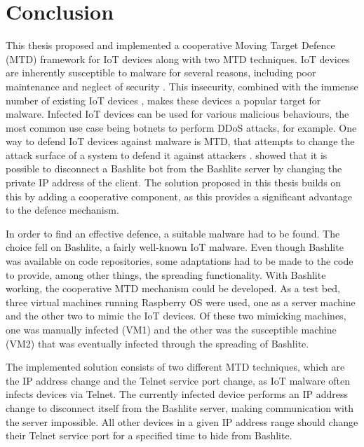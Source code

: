 \chapter{Conclusion}
This thesis proposed and implemented a cooperative Moving Target Defence (MTD) framework for IoT devices along with two MTD techniques. IoT devices are inherently susceptible to malware for several reasons, including poor maintenance and neglect of security \cite{article:DDoSinIoT}. This insecurity, combined with the immense number of existing IoT devices \cite{website:statistaIoT}, makes these devices a popular target for malware. Infected IoT devices can be used for various malicious behaviours, the most common use case being botnets to perform DDoS attacks, for example. One way to defend IoT devices against malware is MTD, that attempts to change the attack surface of a system to defend it against attackers \cite{navas:2021MTDWhere}. \cite{article:vonderAssen} showed that it is possible to disconnect a Bashlite bot from the Bashlite server by changing the private IP address of the client. The solution proposed in this thesis builds on this by adding a cooperative component, as this provides a significant advantage to the defence mechanism.

In order to find an effective defence, a suitable malware had to be found. The choice fell on Bashlite, a fairly well-known IoT malware. Even though Bashlite was available on code repositories, some adaptations had to be made to the code to provide, among other things, the spreading functionality. With Bashlite working, the cooperative MTD mechanism could be developed. As a test bed, three virtual machines running Raspberry OS were used, one as a server machine and the other two to mimic the IoT devices. Of these two mimicking machines, one was manually infected (VM1) and the other was the susceptible machine (VM2) that was eventually infected through the spreading of Bashlite. 

The implemented solution consists of two different MTD techniques, which are the IP address change and the Telnet service port change, as IoT malware often infects devices via Telnet. The currently infected device performs an IP address change to disconnect itself from the Bashlite server, making communication with the server impossible. All other devices in a given IP address range should change their Telnet service port for a specified time to hide from Bashlite.

